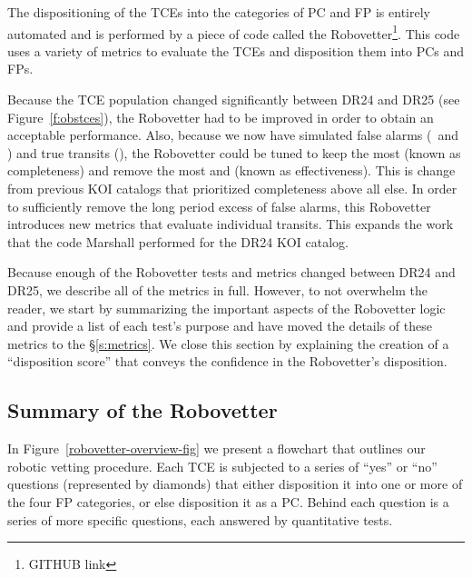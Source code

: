 \label{s:robovetter}
The dispositioning of the TCEs into the categories of PC and FP is entirely automated and is performed by a piece of code called the Robovetter\footnote{GITHUB link}. This code uses a variety of metrics to evaluate the TCEs and disposition them into PCs and FPs.  


Because the TCE population changed significantly between DR24 and DR25 (see Figure~\ref{f:obstces}), the Robovetter had to be improved in order to obtain an acceptable performance.  Also, because we now have simulated false alarms (\invtce\ and \scrtce) and true transits (\injtce), the Robovetter could be tuned to keep the most  (known as completeness) and remove the most  and  (known as effectiveness). This is change from previous KOI catalogs that prioritized completeness above all else.  In order to sufficiently remove the long period excess of false alarms, this Robovetter introduces new metrics that evaluate individual transits. This expands the work that the code Marshall \citep{Mullally2015c} performed for the DR24 KOI catalog.

Because enough of the Robovetter tests and metrics changed between DR24 and DR25, we describe all of the metrics in full.  However, to not overwhelm the reader, we start by summarizing the important aspects of the Robovetter logic and provide a list of each test's purpose and have moved the details of these metrics to the \S\ref{s:metrics}. We close this section by explaining the creation of a ``disposition score'' that conveys the confidence in the Robovetter's disposition.


\subsection{Summary of the Robovetter}

\noindent In Figure~\ref{robovetter-overview-fig} we present a flowchart that outlines our robotic vetting procedure. Each TCE is subjected to a series of ``yes'' or ``no'' questions (represented by diamonds) that either disposition it into one or more of the four FP categories, or else disposition it as a PC. Behind each question is a series of more specific questions, each answered by quantitative tests. 



